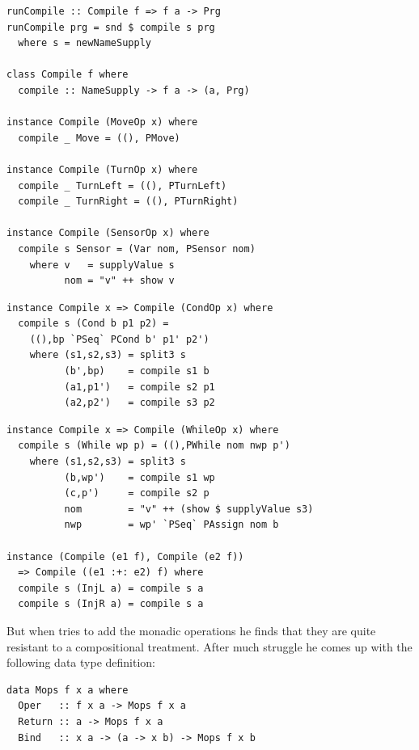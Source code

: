\begin{small}
\begin{verbatim}
runCompile :: Compile f => f a -> Prg
runCompile prg = snd $ compile s prg
  where s = newNameSupply 

class Compile f where
  compile :: NameSupply -> f a -> (a, Prg)

instance Compile (MoveOp x) where
  compile _ Move = ((), PMove) 

instance Compile (TurnOp x) where
  compile _ TurnLeft = ((), PTurnLeft)
  compile _ TurnRight = ((), PTurnRight)

instance Compile (SensorOp x) where
  compile s Sensor = (Var nom, PSensor nom)
    where v   = supplyValue s
          nom = "v" ++ show v
\end{verbatim}
\begin{verbatim}
instance Compile x => Compile (CondOp x) where
  compile s (Cond b p1 p2) = 
    ((),bp `PSeq` PCond b' p1' p2') 
    where (s1,s2,s3) = split3 s
          (b',bp)    = compile s1 b
          (a1,p1')   = compile s2 p1
          (a2,p2')   = compile s3 p2 
\end{verbatim}
\end{small}
\begin{small}
\begin{verbatim}
instance Compile x => Compile (WhileOp x) where
  compile s (While wp p) = ((),PWhile nom nwp p')
    where (s1,s2,s3) = split3 s
          (b,wp')    = compile s1 wp
          (c,p')     = compile s2 p
          nom        = "v" ++ (show $ supplyValue s3)
          nwp        = wp' `PSeq` PAssign nom b

instance (Compile (e1 f), Compile (e2 f)) 
  => Compile ((e1 :+: e2) f) where
  compile s (InjL a) = compile s a
  compile s (InjR a) = compile s a 
\end{verbatim}
\end{small}

But when \studname{} tries to add the monadic operations he finds that
they are quite resistant to a compositional treatment. After much
struggle he comes up with the following data type definition:

\begin{small}
\begin{verbatim}
data Mops f x a where
  Oper   :: f x a -> Mops f x a
  Return :: a -> Mops f x a
  Bind   :: x a -> (a -> x b) -> Mops f x b
\end{verbatim}
\end{small}

